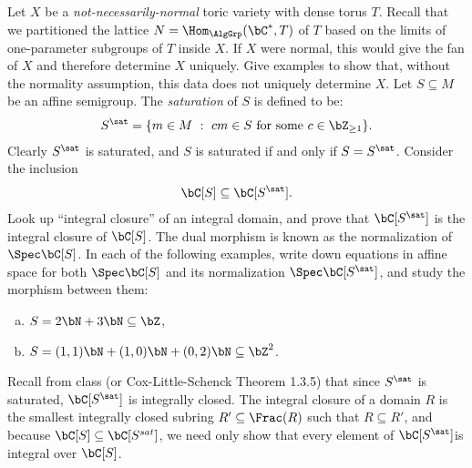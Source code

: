 \begin{homework}[e]
	\prob Let $X$ be a \emph{not-necessarily-normal} toric variety with dense torus $T$. Recall that we partitioned the lattice $N = \Hom_{\AlgGrp}(\bC^*, T)$ of $T$ based on the limits of one-parameter subgroups of $T$ inside $X$. If $X$ were normal, this would give the fan of $X$ and therefore determine $X$ uniquely. Give examples to show that, without the normality assumption, this data does not uniquely determine $X$. 
	 Let $S \subseteq M$ be an affine semigroup. The \emph{saturation} of $S$ is defined to be:
	\begin{align*}
		S^{\sat} = \{m \in M ~ : ~ cm \in S \text{ for some } c\in\bZ _{\geq 1}\}.
	\end{align*}
	Clearly $S^{\sat}$ is saturated, and $S$ is saturated if and only if $S = S^{\sat}$. Consider the inclusion
	\begin{align*}
		\bC[S] \subseteq \bC[S^{\sat}].
	\end{align*}
	Look up ``integral closure'' of an integral domain, and prove that $\bC[S^{\sat}]$ is the integral closure of $\bC[S]$. The dual morphism is known as the normalization of $\Spec \bC[S]$. In each of the following examples, write down equations in affine space for both $\Spec \bC[S]$ and its normalization $\Spec \bC[S^{\sat}]$, and study the morphism between them:
	\begin{enumerate}[(a)]
		\item $S = 2\bN + 3\bN \subseteq \bZ$, 
		\item $S = (1,1)\bN + (1,0)\bN + (0,2)\bN \subseteq \bZ^{2}$.
	\end{enumerate}
	\begin{prf}
		Recall from class (or Cox-Little-Schenck Theorem 1.3.5) that since $S^{\sat}$ is saturated, $\bC[S^{\sat}]$ is integrally closed. The integral closure of a domain $R$ is the smallest integrally closed subring $R' \subseteq \Frac(R)$ such that $R \subseteq R'$, and because $\bC[S] \subseteq \bC[S^{sat}]$, we need only show that every element of $\bC[S^{\sat}]$is integral over $\bC[S]$. 


\end{prf}
\end{homework}
